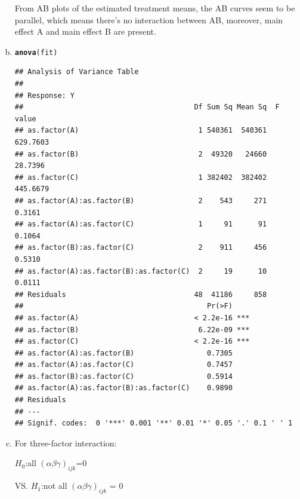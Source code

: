 \documentclass{article}\usepackage[]{graphicx}\usepackage[]{color}
\makeatletter
\newcommand{\hlstd}[1]{\textcolor[rgb]{0.345,0.345,0.345}{#1}}%
\newcommand{\hlkwd}[1]{\textcolor[rgb]{0.737,0.353,0.396}{\textbf{#1}}}%
\newenvironment{kframe}{%
 \def\at@end@of@kframe{}%
 \ifinner\ifhmode%
  \def\at@end@of@kframe{\end{minipage}}%
  \begin{minipage}{\columnwidth}%
 \fi\fi%
 \def\FrameCommand##1{\hskip\@totalleftmargin \hskip-\fboxsep
 \colorbox{shadecolor}{##1}\hskip-\fboxsep
     \hskip-\linewidth \hskip-\@totalleftmargin \hskip\columnwidth}%
 \MakeFramed {\advance\hsize-\width
   \@totalleftmargin\z@ \linewidth\hsize
   \@setminipage}}%
 {\par\unskip\endMakeFramed%
 \at@end@of@kframe}
\newenvironment{knitrout}{}{} %
\makeatother
\begin{document}
\begin{enumerate}[(a)]
\begin{knitrout}
\end{knitrout}

\qquad From AB plots of the estimated treatment means, the AB curves seem to be parallel, which means there's no interaction between AB, moreover, main effect A and main effect B are present.

\item

\begin{knitrout}
\color{fgcolor}\begin{kframe}
\begin{alltt}
  \hlkwd{anova}\hlstd{(fit)}
\end{alltt}
\begin{verbatim}
## Analysis of Variance Table
## 
## Response: Y
##                                        Df Sum Sq Mean Sq  F value
## as.factor(A)                            1 540361  540361 629.7603
## as.factor(B)                            2  49320   24660  28.7396
## as.factor(C)                            1 382402  382402 445.6679
## as.factor(A):as.factor(B)               2    543     271   0.3161
## as.factor(A):as.factor(C)               1     91      91   0.1064
## as.factor(B):as.factor(C)               2    911     456   0.5310
## as.factor(A):as.factor(B):as.factor(C)  2     19      10   0.0111
## Residuals                              48  41186     858         
##                                           Pr(>F)    
## as.factor(A)                           < 2.2e-16 ***
## as.factor(B)                            6.22e-09 ***
## as.factor(C)                           < 2.2e-16 ***
## as.factor(A):as.factor(B)                 0.7305    
## as.factor(A):as.factor(C)                 0.7457    
## as.factor(B):as.factor(C)                 0.5914    
## as.factor(A):as.factor(B):as.factor(C)    0.9890    
## Residuals                                           
## ---
## Signif. codes:  0 '***' 0.001 '**' 0.01 '*' 0.05 '.' 0.1 ' ' 1
\end{verbatim}
\end{kframe}
\end{knitrout}

\item

For three-factor interaction:

\begin{center}
$H_0$:all $(\alpha\beta\gamma)_{ijk}$=0

VS. $H_1$:not all $(\alpha\beta\gamma)_{ijk}$ = 0


\end{center}
\end{enumerate}
\end{document}
